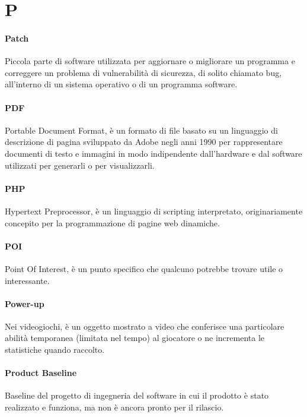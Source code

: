 \documentclass[]{article}
\begin{document}
	\newpage

	\section*{P}

	\paragraph*{Patch}
	Piccola parte di software utilizzata per aggiornare o migliorare un programma e correggere un problema di vulnerabilità di sicurezza, di solito chiamato bug, all'interno di un sistema operativo o di un programma software.

	\paragraph*{PDF}
	Portable Document Format, è un formato di file basato su un linguaggio di descrizione di pagina sviluppato da Adobe negli anni 1990 per rappresentare documenti di testo e immagini in modo indipendente dall'hardware e dal software utilizzati per generarli o per visualizzarli.

	\paragraph*{PHP}
	Hypertext Preprocessor, è un linguaggio di scripting interpretato, originariamente concepito per la programmazione di pagine web dinamiche.

	\paragraph*{POI}
	Point Of Interest, è un punto specifico che qualcuno potrebbe trovare utile o interessante.

    \paragraph*{Power-up}
    Nei videogiochi, è un oggetto mostrato a video che conferisce una particolare abilità temporanea (limitata nel tempo) al giocatore o ne incrementa le statistiche quando raccolto.

	\paragraph*{Product Baseline}
	Baseline del progetto di ingegneria del software in cui il prodotto è stato realizzato e funziona, ma non è ancora pronto per il rilascio.
\end{document}
